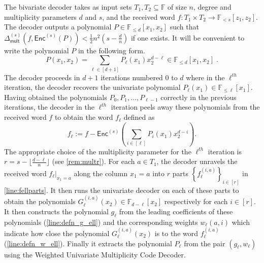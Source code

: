 \documentclass{theoretics}
\def\Field{\mathbb{F}}
\let\F\Field
\newcommand{\enc}{{\mathsf{Enc}}}
\newcommand{\Delm}{\Delta_{\mathsf{mult}}}
\begin{document}
	The bivariate decoder takes as input sets $T_1, T_2 \subseteq \F$ of size
	$n$, degree and multiplicity parameters $d$ and $s$, and the received
	word $f \colon T_1 \times T_2 \to \mathbb{F}_{<s}[z_1, z_2]$. The
	decoder outputs a polynomial $P \in \F_{\leq d}[x_1,x_2]$ such that
	$\Delm^{(s)}(f,\enc^{(s)}(P)) < \frac{1}{2} n^2 (s-\frac{d}{n})$ if one
	exists. It will be convenient to write the polynomial $P$ in the
	following form.
	\[P(x_1,x_2) = \sum_{\ell \in [d+1]} P_{\ell}(x_1)x_2^{d-\ell} \in \mathbb{F}_{\leq d}[x_1, x_2]\;.\]
	The decoder proceeds in $d+1$ iterations numbered $0$ to $d$ where in
	the $\ell^{th}$ iteration, the decoder recovers the univariate
	polynomial $P_\ell(x_1) \in \F_{\leq \ell}[x_1]$. Having obtained the
	polynomials $P_0,P_1,\ldots, P_{\ell-1}$ correctly in the previous
	iterations, the decoder in the $\ell^{th}$ iteration peels away these
	polynomials from the received word $f$ to obtain the word $f_\ell$
	defined as \[f_\ell :=   f - \enc^{(s)}\left(\sum_{i \in [\ell]} P_i(x_1)
	x_2^{d-i}\right). \] The appropriate choice of the multiplicity parameter
	for the $\ell^{th}$ iteration is $r = s - \lfloor \frac{d-\ell}{n}
	\rfloor$ (see \cref{rem:multr}). For each $a \in T_1$, the decoder
	unravels the received word $f_\ell|_{x_1 = a}$ along the column $x_1 = a$ into
	$r$ parts $\left\{f_{\ell}^{(i, a)} \right\}_{i \in [r]}$ in
	\cref{line:fellparts}. It then runs the univariate decoder on each
	of these parts to obtain the polynomials $G^{(i,a)}_\ell(x_2)
	\in \F_{d-\ell}[x_2]$ respectively for each $i \in [r]$. It
	then constructs the polynomial $g_\ell$ from the leading
	coefficients of these polynomials (\cref{line:defn_g_ell}) and the
	corresponding weights $w_\ell(a,i)$ which indicate how
	close the polynomial $G^{(i,a)}_\ell(x_2)$ is to the word
	$f_\ell^{(i,a)}$ (\cref{line:defn_w_ell}). Finally it
	extracts the polynomial $P_\ell$ from the pair $(g_\ell,
	w_\ell)$ using the Weighted Univariate Multiplicity Code Decoder.\\
	
\end{document}
